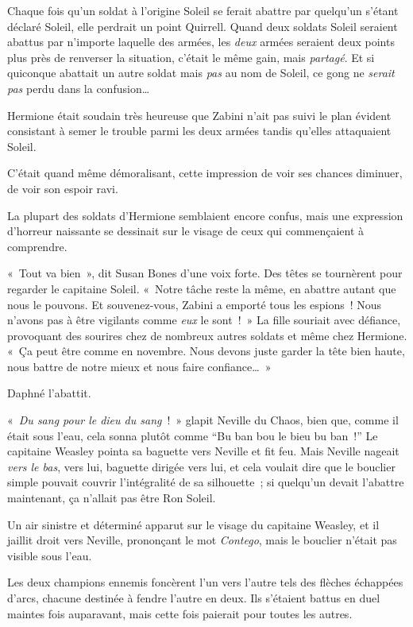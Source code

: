Chaque fois qu'un soldat à l'origine Soleil se ferait abattre par quelqu'un s'étant déclaré Soleil, elle perdrait un point Quirrell. Quand deux soldats Soleil seraient abattus par n'importe laquelle des armées, les \emph{deux} armées seraient deux points plus près de renverser la situation, c'était le même gain, mais \emph{partagé}. Et si quiconque abattait un autre soldat mais \emph{pas} au nom de Soleil, ce gong ne \emph{serait pas} perdu dans la confusion…

Hermione était soudain très heureuse que Zabini n'ait pas suivi le plan évident consistant à semer le trouble parmi les deux armées tandis qu'elles attaquaient Soleil.

C'était quand même démoralisant, cette impression de voir ses chances diminuer, de voir son espoir ravi.

La plupart des soldats d'Hermione semblaient encore confus, mais une expression d'horreur naissante se dessinait sur le visage de ceux qui commençaient à comprendre.

«~Tout va bien~», dit Susan Bones d'une voix forte. Des têtes se tournèrent pour regarder le capitaine Soleil. «~Notre tâche reste la même, en abattre autant que nous le pouvons. Et souvenez-vous, Zabini a emporté tous les espions~! Nous n'avons pas à être vigilants comme \emph{eux} le sont~!~» La fille souriait avec défiance, provoquant des sourires chez de nombreux autres soldats et même chez Hermione. «~Ça peut être comme en novembre. Nous devons juste garder la tête bien haute, nous battre de notre mieux et nous faire confiance…~»

Daphné l'abattit.

\later

«~\emph{Du sang pour le dieu du sang}~!~» glapit Neville du Chaos, bien que, comme il était sous l'eau, cela sonna plutôt comme “Bu ban bou le bieu bu ban~!”
Le capitaine Weasley pointa sa baguette vers Neville et fit feu. Mais Neville nageait \emph{vers le bas}, vers lui, baguette dirigée vers lui, et cela voulait dire que le bouclier simple pouvait couvrir l'intégralité de sa silhouette~; si quelqu'un devait l'abattre maintenant, ça n'allait pas être Ron Soleil.

Un air sinistre et déterminé apparut sur le visage du capitaine Weasley, et il jaillit droit vers Neville, prononçant le mot \emph{Contego}, mais le bouclier n'était pas visible sous l'eau.

Les deux champions ennemis foncèrent l'un vers l'autre tels des flèches échappées d'arcs, chacune destinée à fendre l'autre en deux. Ils s'étaient battus en duel maintes fois auparavant, mais cette fois paierait pour toutes les autres.

